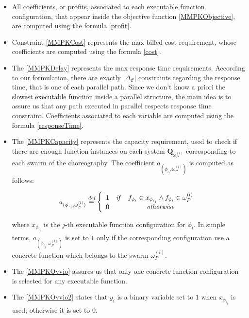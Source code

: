\documentclass[12pt,a4paper]{report}
\newcommand{\mathDef}{\overset{\textit{def}}{=}}
\begin{document}
\begin{itemize}
	\item All coefficients, or profits, associated to each executable function configuration, that appear inside the objective function \ref{MMPKObjective}, are computed using the formula \ref{profit}.
	
	\item Constraint \ref{MMPKCost} represents the max billed cost requirement, whose coefficients are computed using the formula \ref{cost}. 
	
    \item The \ref{MMPKDelay} represents the max response time requirements. According to our formulation, there are exactly $|\Delta_{\mathcal{C}}|$ constraints regarding the response time, that is one of each parallel path. Since we don't know a priori the slowest executable function inside a parallel structure, the main idea is to assure us that any path executed in parallel respects response time constraint. Coefficients associated to each variable are computed using the formula \ref{responseTime}.
    
    \item The \ref{MMPKCapacity} represents the capacity requirement, used to check if there are enough function instances on each system $\textbf{Q}_{\omega_{P}^{(l)}}$ corresponding to each swarm of the choreography. The coefficient $a_{(\phi_{i_{j}},\omega_{P}^{(l)})}$ is computed as follows:
    
    \begin{equation}	
    	a_{(\phi_{i_{j}},\omega_{P}^{(l)})} \mathDef \left\{
    	\begin{array}{lcc}
    		1 & \text{\textit{if}} & f_{\phi_i} \in x_{\phi_{i_j}} \wedge f_{\phi_i} \in \omega_{P}^{(l)} \\ 
    		0 & & \text{\textit{otherwise}} \\
    	\end{array} \right.
    \end{equation}
    
	where $x_{\phi_{i_j}}$ is the $j$-th executable function configuration for $\phi_i$. In simple terms, $a_{(\phi_{i_{j}},\omega_{P}^{(l)})}$ is set to $1$ only if the corresponding configuration use a concrete function which belongs to the swarm $\omega_{P}^{(l)}$.
	
	\item The \ref{MMPKOvvio} assures us that only one concrete function configuration is selected for any executable function. 
	
	\item The \ref{MMPKOvvio2} states that $y_i$ is a binary variable set to $1$ when $x_{\phi_{i_j}}$ is used; otherwise it is set to $0$.
	
\end{itemize}
\end{document}
